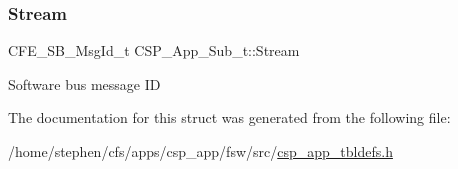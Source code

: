 \subsubsection{\texorpdfstring{Stream}{Stream}}
{\footnotesize\ttfamily C\+F\+E\+\_\+\+S\+B\+\_\+\+Msg\+Id\+\_\+t C\+S\+P\+\_\+\+App\+\_\+\+Sub\+\_\+t\+::\+Stream}

Software bus message ID 

The documentation for this struct was generated from the following file\+:\begin{DoxyCompactItemize}
\item 
/home/stephen/cfs/apps/csp\+\_\+app/fsw/src/\hyperlink{csp__app__tbldefs_8h}{csp\+\_\+app\+\_\+tbldefs.\+h}\end{DoxyCompactItemize}
